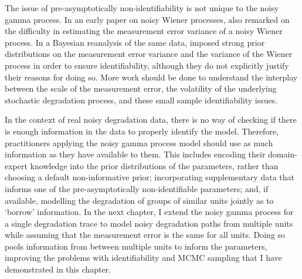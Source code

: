 The issue of pre-asymptotically non-identifiability is not unique to the noisy gamma process. In an early paper on noisy Wiener processes, \citet{whitmore_1995} also remarked on the difficulty in estimating the measurement error variance of a noisy Wiener process. In a Bayesian reanalysis of the same data, \citet{hamada_2008} imposed strong prior distributions on the measurement error variance and the variance of the Wiener process in order to ensure identifiability, although they do not explicitly justify their reasons for doing so. More work should be done to understand the interplay between the scale of the measurement error, the volatility of the underlying stochastic degradation process, and these small sample identifiability issues.

In the context of real noisy degradation data, there is no way of checking if there is enough information in the data to properly identify the model. Therefore, practitioners applying the noisy gamma process model should use as much information as they have available to them. This includes encoding their domain-expert knowledge into the prior distributions of the parameters, rather than choosing a default non-informative prior; incorporating supplementary data that informs one of the pre-asymptotically non-identifiable parameters; and, if available, modelling the degradation of groups of similar units jointly as to `borrow' information. In the next chapter, I extend the noisy gamma process for a single degradation trace to model noisy degradation paths from multiple units while assuming that the measurement error is the same for all units. Doing so pools information from between multiple units to inform the parameters, improving the problems with identifiability and MCMC sampling that I have demonstrated in this chapter.